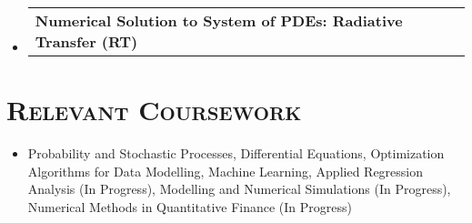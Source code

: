 \documentclass[11pt]{article}
\makeatletter
\newcommand{\headerrow}[2]
{\begin{tabular*}{\linewidth}{l@{\extracolsep{\fill}}r}
    #1 &
    #2 \\
\end{tabular*}}
\makeatother
\begin{document}
\begin{itemize}[leftmargin=0em]
\item[]
    \headerrow {\textbf{Numerical Solution to System of PDEs: Radiative Transfer (RT)}}{}


\end{itemize}

\section*{\textsc{\textbf{Relevant Coursework}}}
\begin{itemize}[itemsep=0em, leftmargin=0.7em]
\item[]
    Probability and Stochastic Processes,
    Differential Equations,
    Optimization Algorithms for Data Modelling,
    Machine Learning,
    Applied Regression Analysis (In Progress),
    Modelling and Numerical Simulations (In Progress),
    Numerical Methods in Quantitative Finance (In Progress)
\end{itemize}
\end{document}

